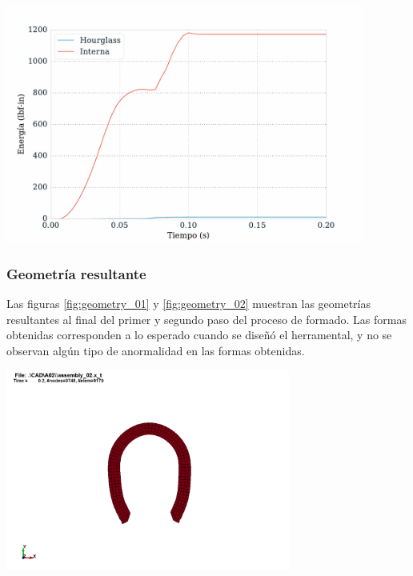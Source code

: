 \begin{center}
\includegraphics[width=0.88\textwidth]{src/ch4/hourglass_internal_01.pdf}
\label{fig:hourglass_internal_01}
\end{center}


\subsubsection{Geometría resultante}



Las figuras \ref{fig:geometry_01} y \ref{fig:geometry_02} muestran las geometrías 
resultantes al final del primer y segundo paso del proceso de formado. Las formas 
obtenidas corresponden a lo esperado cuando se diseñó el herramental, y no se observan 
algún tipo de anormalidad en las formas obtenidas.

\begin{center}
\includegraphics[width=0.7\textwidth]{src/ch4/geometry_01.png}
\label{fig:geometry_01}
\end{center}

